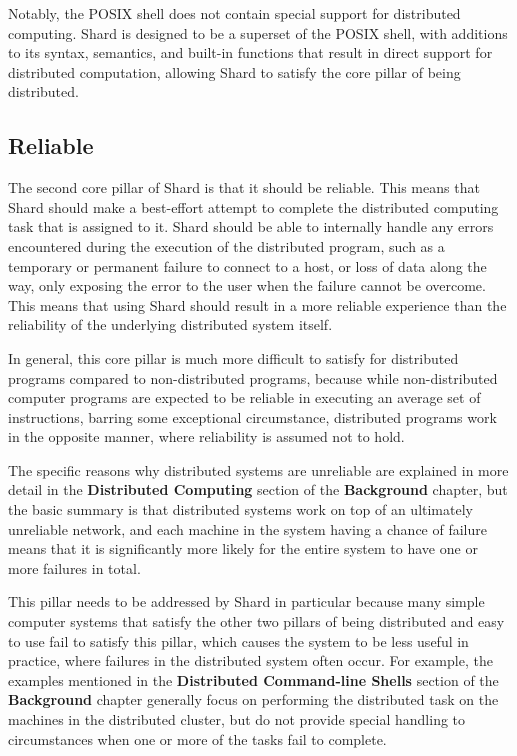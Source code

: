 \documentclass[oneside]{report}
\begin{document}
Notably, the POSIX shell does not contain special support for distributed computing. Shard is designed to be a superset of the POSIX shell, with additions to its syntax, semantics, and built-in functions that result in direct support for distributed computation, allowing Shard to satisfy the core pillar of being distributed.

\subsection{Reliable}

The second core pillar of Shard is that it should be reliable.
This means that Shard should make a best-effort attempt to complete the distributed computing task that is assigned to it.
Shard should be able to internally handle any errors encountered during the execution of the distributed program, such as a temporary or permanent failure to connect to a host, or loss of data along the way, only exposing the error to the user when the failure cannot be overcome.
This means that using Shard should result in a more reliable experience than the reliability of the underlying distributed system itself.

In general, this core pillar is much more difficult to satisfy for distributed programs compared to non-distributed programs, because while non-distributed computer programs are expected to be reliable in executing an average set of instructions, barring some exceptional circumstance, distributed programs work in the opposite manner, where reliability is assumed not to hold.

The specific reasons why distributed systems are unreliable are explained in more detail in the \textbf{Distributed Computing} section of the \textbf{Background} chapter, but the basic summary is that distributed systems work on top of an ultimately unreliable network, and each machine in the system having a chance of failure means that it is significantly more likely for the entire system to have one or more failures in total.

This pillar needs to be addressed by Shard in particular because many simple computer systems that satisfy the other two pillars of being distributed and easy to use fail to satisfy this pillar, which causes the system to be less useful in practice, where failures in the distributed system often occur.
For example, the examples mentioned in the \textbf{Distributed Command-line Shells} section of the \textbf{Background} chapter generally focus on performing the distributed task on the machines in the distributed cluster, but do not provide special handling to circumstances when one or more of the tasks fail to complete.
\end{document}
